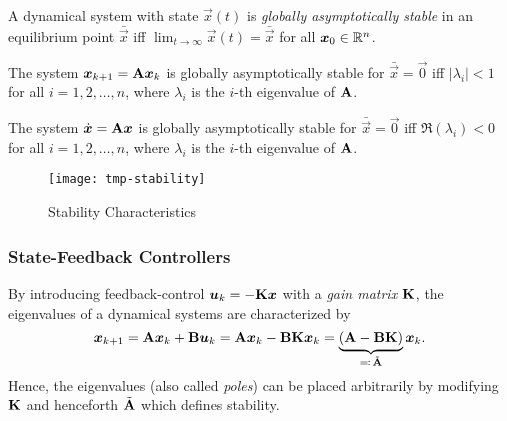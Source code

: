 			\begin{definition}
				A dynamical system with state \( \vec{x}(t) \) is \emph{globally asymptotically stable} in an equilibrium point \( \bar{\vec{x}} \) iff \( \lim_{t \to \infty} \vec{x}(t) = \bar{\vec{x}} \) for all \( \bm{x}_0 \in \mathbb{R}^n \).
			\end{definition}

			\begin{theorem}
				The system \( \bm{x}_{k + 1} = \bm{\mathrm{A}} \bm{x}_k \) is globally asymptotically stable for \( \bar{\vec{x}} = \vec{0} \) iff \( \lvert \lambda_i \rvert < 1 \) for all \( i = 1, 2, \dots, n \), where \( \lambda_i \) is the \(i\)-th eigenvalue of \(\bm{\mathrm{A}}\).
			\end{theorem}
			\begin{theorem}
				The system \( \dot{\bm{x}} = \bm{\mathrm{A}} \bm{x} \) is globally asymptotically stable for \( \bar{\vec{x}} = \vec{0} \) iff \( \Re(\lambda_i) < 0 \) for all \( i = 1, 2, \dots, n \), where \( \lambda_i \) is the \(i\)-th eigenvalue of \(\bm{\mathrm{A}}\).
			\end{theorem}

			\begin{figure}
				\centering
				\texttt{[image: tmp-stability]}
				\caption{Stability Characteristics}
				\label{fig:stability}
			\end{figure}

			\subsubsection{State-Feedback Controllers}
				By introducing feedback-control \( \bm{u}_k = -\bm{\mathrm{K}} \bm{x} \) with a \emph{gain matrix} \(\bm{\mathrm{K}}\), the eigenvalues of a dynamical systems are characterized by
				\begin{equation}
					\bm{x}_{k + 1}
						= \bm{\mathrm{A}} \bm{x}_k + \bm{\mathrm{B}} \bm{u}_k
						= \bm{\mathrm{A}} \bm{x}_k - \bm{\mathrm{B}} \bm{\mathrm{K}} \bm{x}_k
						= \underbrace{(\bm{\mathrm{A}} - \bm{\mathrm{B}} \bm{\mathrm{K}})}_{\eqqcolon\, \tilde{\bm{\mathrm{A}}}} \bm{x}_k.
				\end{equation}
				Hence, the eigenvalues (also called \emph{poles}) can be placed arbitrarily by modifying \(\bm{\mathrm{K}}\) and henceforth \(\tilde{\bm{\mathrm{A}}}\) which defines stability.


